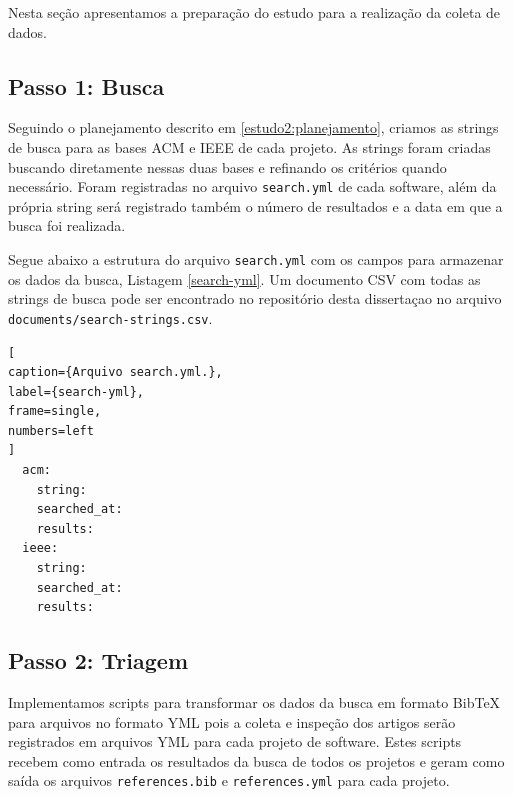 Nesta seção apresentamos a preparação do estudo para a realização da coleta de
dados.

\subsection{Passo 1: Busca}

Seguindo o planejamento descrito em \ref{estudo2:planejamento}, criamos as
strings de busca para as bases ACM e IEEE de cada projeto. As strings foram
criadas buscando diretamente nessas duas bases e refinando os critérios quando
necessário. Foram registradas no arquivo \texttt{search.yml} de cada software,
além da própria string será registrado também o número de resultados e a data
em que a busca foi realizada.


Segue abaixo a estrutura do arquivo \texttt{search.yml} com os campos para
armazenar os dados da busca, Listagem \ref{search-yml}.  Um documento
CSV com todas as strings de busca pode ser encontrado no repositório desta
dissertaçao no arquivo \texttt{documents/search-strings.csv}.


\begin{lstlisting}[
caption={Arquivo search.yml.},
label={search-yml},
frame=single,
numbers=left
]
  acm:
    string:
    searched_at:
    results:
  ieee:
    string:
    searched_at:
    results:
\end{lstlisting}

\subsection{Passo 2: Triagem}

Implementamos scripts para transformar os dados da busca em formato BibTeX para
arquivos no formato YML pois a coleta e inspeção dos artigos serão registrados
em arquivos YML para cada projeto de software. Estes scripts recebem como entrada
os resultados da busca de todos os projetos e geram como saída os arquivos \texttt{references.bib}
e \texttt{references.yml} para cada projeto.

